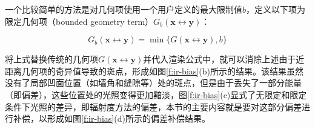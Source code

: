 一个比较简单的方法是对几何项使用一个用户定义的最大限制值$b$，定义以下项为限定几何项（bounded geometry term）$G_b(\mathbf{x}\leftrightarrow\mathbf{y})$：

\begin{equation}
	G_b(\mathbf{x}\leftrightarrow\mathbf{y})=\min\{G(\mathbf{x}\leftrightarrow\mathbf{y}),b\}
\end{equation}

\noindent 将上式替换传统的几何项$G(\mathbf{x}\leftrightarrow\mathbf{y})$并代入渲染公式中，就可以消除上述由于近距离几何项的奇异值导致的斑点，形成如图\ref{f:ir-bias}(b)所示的结果。该结果虽然没有了局部凹面位置（如墙角和缝隙等）处的斑点，但是由于丢失了一部分能量（即偏差），这些位置处的光照变得更加黯淡，图\ref{f:ir-bias}(c)显式了无限定和限定条件下光照的差异，即辐射度方法的偏差，本节的主要内容就是要对这部分偏差进行补偿，以形成如图\ref{f:ir-bias}(d)所示的偏差补偿结果。

